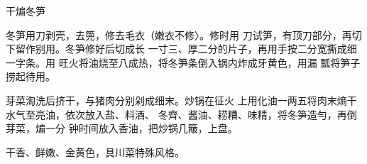 \begin{recipe}{干煸冬笋}

\ingredients


\cooking

\step 冬笋用刀剥壳，去篼，修去毛衣（嫩衣不修〉。修时用 刀试笋，有顶刀部分，再切下留作别用。冬笋修好后切成长 一寸三、厚二分的片子，再用手按二分宽撕成细一字条。用 旺火将油烧至八成热，将冬笋条倒入锅内炸成牙黄色，用漏 瓢将笋子捞起待用。

\step 芽菜淘洗后挤干，与猪肉分别剁成细末。炒锅在征火 上用化油一两五将肉末熵干水气至亮油，依次放入盐、料酒、 冬齊、酱油、耢糟、味精，将冬笋造勻，再倒芽菜，煸一分 钟时间放入香油，把炒锅几簸，上盘。

\notes

干香、鲜嫩、金黄色，具川菜特殊风格。

\end{recipe}

